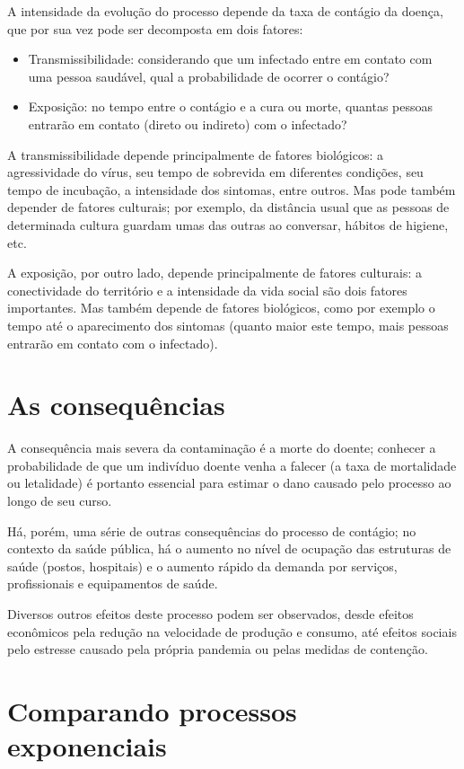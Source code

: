 \documentclass[12pt]{extarticle}
\begin{document}
A intensidade da evolução do processo depende da taxa de contágio da doença, que por sua vez pode ser decomposta em dois fatores:

\begin{itemize}
\item {Transmissibilidade}: considerando que um infectado entre em contato com uma pessoa saudável, qual a probabilidade de ocorrer o contágio?
\item {Exposição}: no tempo entre o contágio e a cura ou morte, quantas pessoas entrarão em contato (direto ou indireto) com o infectado?
\end{itemize}

A transmissibilidade depende principalmente de fatores biológicos: a agressividade do vírus, seu tempo de sobrevida em diferentes condições, seu tempo de incubação, a intensidade dos sintomas, entre outros. Mas pode também depender de fatores culturais; por exemplo, da distância usual que as pessoas de determinada cultura guardam umas das outras ao conversar, hábitos de higiene, etc. 

A exposição, por outro lado, depende principalmente de fatores culturais: a conectividade do território e a intensidade da vida social são dois fatores importantes. Mas também depende de fatores biológicos, como por exemplo o tempo até o aparecimento dos sintomas (quanto maior este tempo, mais pessoas entrarão em contato com o infectado).

\section{As consequências}

A consequência mais severa da contaminação é a morte do doente; conhecer a probabilidade de que um indivíduo doente venha a falecer (a taxa de mortalidade ou letalidade) é portanto essencial para estimar o dano causado pelo processo ao longo de seu curso.

Há, porém, uma série de outras consequências do processo de contágio; no contexto da saúde pública, há o aumento no nível de ocupação das estruturas de saúde (postos, hospitais) e o aumento rápido da demanda por serviços, profissionais e equipamentos de saúde. 

Diversos outros efeitos deste processo podem ser observados, desde efeitos econômicos pela redução na velocidade de produção e consumo, até efeitos sociais pelo estresse causado pela própria pandemia ou pelas medidas de contenção.

\section{Comparando processos exponenciais}
\end{document}

